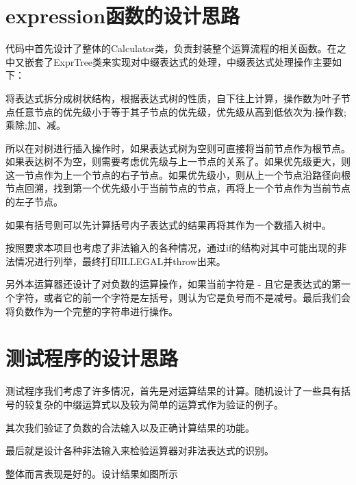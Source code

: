\documentclass[UTF8]{ctexart}
\begin{document}
	
	\pagestyle{fancy}
	\fancyhead{}
	
    \section{expression函数的设计思路}
    代码中首先设计了整体的Calculator类，负责封装整个运算流程的相关函数。在之中又嵌套了ExprTree类来实现对中缀表达式的处理，中缀表达式处理操作主要如下：
    
    将表达式拆分成树状结构，根据表达式树的性质，自下往上计算，操作数为叶子节点任意节点的优先级小于等于其子节点的优先级，优先级从高到低依次为:操作数;乘除;加、减。

    所以在对树进行插入操作时，如果表达式树为空则可直接将当前节点作为根节点。如果表达树不为空，则需要考虑优先级与上一节点的关系了。如果优先级更大，则这一节点作为上一个节点的右子节点。如果优先级小，则从上一个节点沿路径向根节点回溯，找到第一个优先级小于当前节点的节点，再将上一个节点作为当前节点的左子节点。

    如果有括号则可以先计算括号内子表达式的结果再将其作为一个数插入树中。

    按照要求本项目也考虑了非法输入的各种情况，通过if的结构对其中可能出现的非法情况进行列举，最终打印ILLEGAL并throw出来。

    另外本运算器还设计了对负数的运算操作，如果当前字符是 - 且它是表达式的第一个字符，或者它的前一个字符是左括号，则认为它是负号而不是减号。最后我们会将负数作为一个完整的字符串进行操作。
	\section{测试程序的设计思路}
	
    测试程序我们考虑了许多情况，首先是对运算结果的计算。随机设计了一些具有括号的较复杂的中缀运算式以及较为简单的运算式作为验证的例子。 
		
    其次我们验证了负数的合法输入以及正确计算结果的功能。

    最后就是设计各种非法输入来检验运算器对非法表达式的识别。

    整体而言表现是好的。设计结果如图所示
\end{document}
